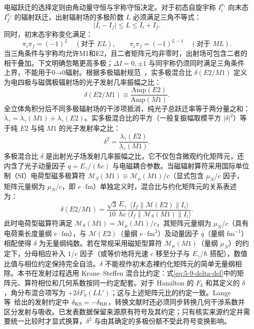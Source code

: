 电磁跃迁的选择定则由角动量守恒与宇称守恒决定。对于初态自旋宇称 $I_i^{\pi_i}$ 向末态 $I_f^{\pi_f}$ 的辐射跃迁，出射辐射场的多极阶数 $L$ 必须满足三角不等式：
\begin{equation}\label{eq:5-9-triangular}
|I_i - I_f| \le L \le I_i + I_f.
\end{equation}
同时，初末态宇称变化满足：
\begin{equation}\label{eq:5-9-parity-sel}
\pi_i \pi_f = (-1)^L \quad (\text{对于 } EL), \qquad \pi_i \pi_f = (-1)^{L-1} \quad (\text{对于 } ML).
\end{equation}
当三角条件与宇称均允许M1和E2，且二者矩阵元均非零时，出射场可包含二者的相干叠加。下文明确忽略更高多极；$\Delta I=0,\pm1$ 与同宇称仍须同时满足三角条件上界，不能用于0→0辐射。根据多极辐射规范~\cite{lange-kumar-hamilton-1982-multipole-admixtures}，实多极混合比 $\delta(E2/M1)$ 定义为电四极与磁偶极辐射场的光子发射几率振幅之比：
\begin{equation}\label{eq:5-9-delta-amp}
\delta(E2/M1) \equiv \frac{\text{Amp}(E2)}{\text{Amp}(M1)}.
\end{equation}
全立体角积分后不同多极辐射场的干涉项抵消，纯光子总跃迁率等于两分量之和：$\lambda_\gamma = \lambda_\gamma(M1) + \lambda_\gamma(E2)$。实多极混合比的平方（一般复振幅取模平方 $|\delta|^2$）等于纯 $E2$ 与纯 $M1$ 的光子发射率之比：
\begin{equation}\label{eq:5-9-delta-sq}
\delta^2 = \frac{\lambda_\gamma(E2)}{\lambda_\gamma(M1)}.
\end{equation}
多极混合比 $\delta$ 是出射光子场发射几率振幅之比，它不仅包含微观约化矩阵元，还内含了光子动量因子 $q = E_\gamma / (\hbar c)$ 与电磁耦合参数。当磁辐射算符采用国际单位制（SI）电荷型磁多极算符 $\mathcal{M}_S(M1) \equiv \mathcal{M}_\mu(M1)/c$（显式包含 $\mu_N/c$ 因子，矩阵元量纲为 $\mu_N/c$，即 $e\cdot\text{fm}$）单独定义时，混合比与约化矩阵元的关系表述为：
\begin{equation}\label{eq:5-9-delta-def}
\delta(E2/M1) = \frac{\sqrt{3}}{10} \frac{E_\gamma}{\hbar c} \frac{\langle I_f \| \mathcal{M}(E2) \| I_i \rangle}{\langle I_f \| \mathcal{M}_S(M1) \| I_i \rangle}.
\end{equation}
此时电荷型磁算符满足 $\mathcal{M}_S(M1) = \mathcal{M}_\mu(M1)/c$，其矩阵元量纲为 $\mu_N/c$（具有电荷乘长度量纲 $e\cdot\text{fm}$），与 $\mathcal{M}(E2)$（量纲 $e\cdot\text{fm}^2$）及动量因子 $q$（量纲 $\text{fm}^{-1}$）相配使得 $\delta$ 为无量纲纯数。若在常规采用磁矩型算符 $\mathcal{M}_\mu(M1)$（量纲 $\mu_N$）的约定下，分母相应补入 $1/c$ 因子（或等价地将光速 $c$ 移至分子与 $E_\gamma/\hbar$ 搭配），数值比值与相位约定保持完全自洽。$\delta$ 不能视作初末态裸约化矩阵元的简单无量纲相除。本书在发射过程选用 Krane--Steffen 混合比约定：式\eqref{eq:5-9-delta-def}中的矩阵元、算符相位和几何系数按同一约定配套。对于 Hamilton 的 $F_k$ 和其定义的 $\delta$，角分布混合项写为 $+2\delta F_k(LL')$；这与上述矩阵元比的约定一致。Lange 等~\cite{lange-kumar-hamilton-1982-multipole-admixtures}给出的发射约定中 $\delta_{\rm KS}=-\delta_{\rm RB}$，转换文献时还必须同步转换几何干涉系数并区分发射与吸收。已发表数据保留来源原有符号及其约定；只有核实来源约定并需要统一比较时才显式换算，$\delta^2$ 与由其确定的多极份额不受此符号变换影响。

